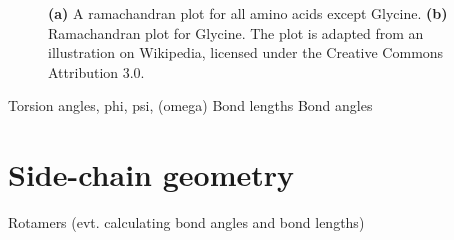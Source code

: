 \begin{figure}
	\centering
    \caption{\textbf{(a)} A ramachandran plot for all amino
      acids except Glycine. \textbf{(b)}  Ramachandran plot
      for Glycine. The plot is adapted from an illustration on Wikipedia, licensed under the Creative Commons Attribution 3.0.}
\end{figure}



Torsion angles, phi, psi, (omega)
Bond lengths
Bond angles


\section{Side-chain geometry}
Rotamers (evt. calculating bond angles and bond lengths)
